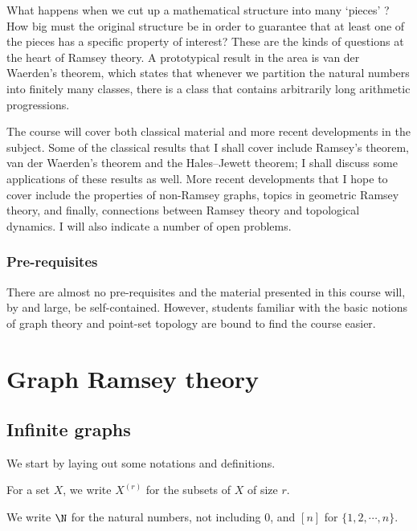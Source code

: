 \documentclass[a4paper]{article}
\begin{document}
\maketitle
{\small
\setlength{\parindent}{0em}
\setlength{\parskip}{1em}

What happens when we cut up a mathematical structure into many `pieces' ? How big must the original structure be in order to guarantee that at least one of the pieces has a specific property of interest? These are the kinds of questions at the heart of Ramsey theory. A prototypical result in the area is van der Waerden's theorem, which states that whenever we partition the natural numbers into finitely many classes, there is a class that contains arbitrarily long arithmetic progressions.

The course will cover both classical material and more recent developments in the subject. Some of the classical results that I shall cover include Ramsey's theorem, van der Waerden's theorem and the Hales--Jewett theorem; I shall discuss some applications of these results as well. More recent developments that I hope to cover include the properties of non-Ramsey graphs, topics in geometric Ramsey theory, and finally, connections between Ramsey theory and topological dynamics. I will also indicate a number of open problems.

\subsubsection*{Pre-requisites}
There are almost no pre-requisites and the material presented in this course will, by and large, be self-contained. However, students familiar with the basic notions of graph theory and point-set topology are bound to find the course easier.
}
\tableofcontents

\section{Graph Ramsey theory}
\subsection{Infinite graphs}
We start by laying out some notations and definitions.
\begin{notation}
  For a set $X$, we write $X^{(r)}$ for the subsets of $X$ of size $r$.
\end{notation}
\begin{notation}
  We write $\N$\index{$\N$} for the natural numbers, not including $0$, and $[n]$\index{$[n]$} for $\{1, 2, \cdots, n\}$.
\end{notation}
\end{document}
